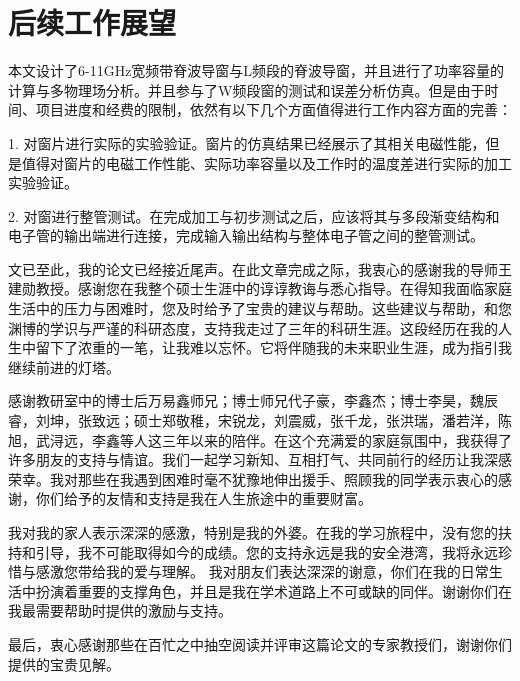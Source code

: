 \documentclass[master]{thesis-uestc}
\begin{document}
\section{后续工作展望}
本文设计了6-11GHz宽频带脊波导窗与L频段的脊波导窗，并且进行了功率容量的计算与多物理场分析。并且参与了W频段窗的测试和误差分析仿真。但是由于时间、项目进度和经费的限制，依然有以下几个方面值得进行工作内容方面的完善：

1. 对窗片进行实际的实验验证。窗片的仿真结果已经展示了其相关电磁性能，但是值得对窗片的电磁工作性能、实际功率容量以及工作时的温度差进行实际的加工实验验证。

2. 对窗进行整管测试。在完成加工与初步测试之后，应该将其与多段渐变结构和电子管的输出端进行连接，完成输入输出结构与整体电子管之间的整管测试。


\thesisacknowledgement
文已至此，我的论文已经接近尾声。在此文章完成之际，我衷心的感谢我的导师王建勋教授。感谢您在我整个硕士生涯中的谆谆教诲与悉心指导。在得知我面临家庭生活中的压力与困难时，您及时给予了宝贵的建议与帮助。这些建议与帮助，和您渊博的学识与严谨的科研态度，支持我走过了三年的科研生涯。这段经历在我的人生中留下了浓重的一笔，让我难以忘怀。它将伴随我的未来职业生涯，成为指引我继续前进的灯塔。

感谢教研室中的博士后万易鑫师兄；博士师兄代子豪，李鑫杰；博士李昊，魏辰睿，刘坤，张致远；硕士郑敬稚，宋锐龙，刘震威，张千龙，张洪瑞，潘若洋，陈旭，武浔远，李鑫等人这三年以来的陪伴。在这个充满爱的家庭氛围中，我获得了许多朋友的支持与情谊。我们一起学习新知、互相打气、共同前行的经历让我深感荣幸。我对那些在我遇到困难时毫不犹豫地伸出援手、照顾我的同学表示衷心的感谢，你们给予的友情和支持是我在人生旅途中的重要财富。

我对我的家人表示深深的感激，特别是我的外婆。在我的学习旅程中，没有您的扶持和引导，我不可能取得如今的成绩。您的支持永远是我的安全港湾，我将永远珍惜与感激您带给我的爱与理解。
我对朋友们表达深深的谢意，你们在我的日常生活中扮演着重要的支撑角色，并且是我在学术道路上不可或缺的同伴。谢谢你们在我最需要帮助时提供的激励与支持。


最后，衷心感谢那些在百忙之中抽空阅读并评审这篇论文的专家教授们，谢谢你们提供的宝贵见解。




\end{document}
